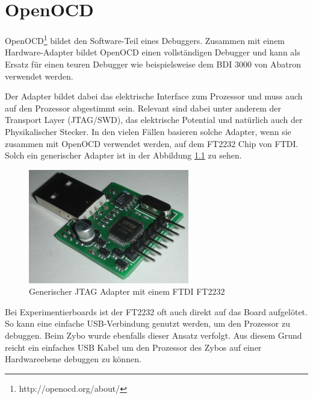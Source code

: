 \chapter{OpenOCD}
OpenOCD\footnote{http://openocd.org/about/} bildet den Software-Teil eines Debuggers.
Zusammen mit einem Hardware-Adapter bildet OpenOCD einen vollständigen Debugger und kann als Ersatz für einen teuren Debugger wie beispielsweise dem BDI 3000 von Abatron verwendet werden.

Der Adapter bildet dabei das elektrische Interface zum Prozessor und muss auch auf den Prozessor abgestimmt sein.
Relevant sind dabei unter anderem der Transport Layer (JTAG/SWD), das elektrische Potential und natürlich auch der Physikalischer Stecker.
In den vielen Fällen basieren solche Adapter, wenn sie zusammen mit OpenOCD verwendet werden, auf dem FT2232 Chip von FTDI.
Solch ein generischer Adapter ist in der Abbildung \ref{fig:GenerischerFT2232Adapter} zu sehen.

\begin{figure}[htbp]
	\centering
		\includegraphics[width=7cm,keepaspectratio]{images/JTAGAdapter.jpg}
	\caption[Generischer JTAG Adapter mit einem FTDI FT2232]{Generischer JTAG Adapter mit einem FTDI FT2232\footnotemark}
	\label{fig:GenerischerFT2232Adapter}
\end{figure}

Bei Experimentierboards ist der FT2232 oft auch direkt auf das Board aufgelötet.
So kann eine einfache USB-Verbindung genutzt werden, um den Prozessor zu debuggen.
Beim Zybo wurde ebenfalls dieser Ansatz verfolgt.
Aus diesem Grund reicht ein einfaches USB Kabel um den Prozessor des Zybos auf einer Hardwareebene debuggen zu können.



